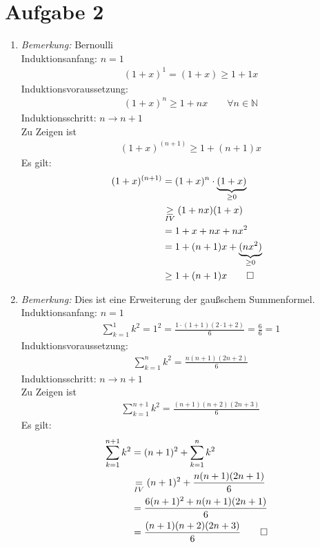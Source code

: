 \section{Aufgabe 2}
    \begin{enumerate}[label={\alph*)}]
      \item
      \textit{Bemerkung:} Bernoulli\\
      Induktionsanfang: $n=1$ \begin{align*}&(1+x)^{1}=(1+x) \geq 1+1x\end{align*}
      Induktionsvoraussetzung: \begin{align*}&(1+x)^{n} \geq 1+nx\qquad \forall n \in \mathbb{N}\end{align*}
      Induktionsschritt: $n\rightarrow n+1$ \\
      Zu Zeigen ist \begin{align*}&(1+x)^{(n+1)} \geq 1+(n+1)x\end{align*}
      Es gilt: \begin{align*}(1+x)^{(n+1)}& =(1+x)^n\cdot \underbrace{(1+x)}_{\geq0}\\ &\underset{IV}{\geq}(1+nx)(1+x)\\ &=1+x+nx+nx^2\\ &=1+(n+1)x+\underbrace{(nx^2)}_{\geq0}\\ &\geq 1+(n+1)x\qed\end{align*}
      \item
      \textit{Bemerkung:} Dies ist eine Erweiterung der gaußschem Summenformel.\\
      Induktionsanfang: $n=1$ \begin{align*}&\sum_{k=1}^{1}k^2=1^2=\frac{1\cdot (1+1)(2\cdot 1+2)}{6}=\frac{6}{6}=1\end{align*}
      Induktionsvoraussetzung: \begin{align*}&\sum_{k=1}^{n}k^2=\frac{n(n+1)(2n+2)}{6}\end{align*}
      Induktionsschritt: $n\rightarrow n+1$ \\
      Zu Zeigen ist \begin{align*}&\sum_{k=1}^{n+1}k^2=\frac{(n+1)(n+2)(2n+3)}{6}\end{align*}
      Es gilt: \begin{align*}\sum_{k=1}^{n+1}k^2& =(n+1)^2+\sum_{k=1}^{n}k^2\\ &\underset{IV}{=}(n+1)^2+\frac{n(n+1)(2n+1)}{6}\\ &=\frac{6(n+1)^2+n(n+1)(2n+1)}{6}\\ &=\frac{(n+1)(n+2)(2n+3)}{6}\qed\end{align*}
    \end{enumerate}

